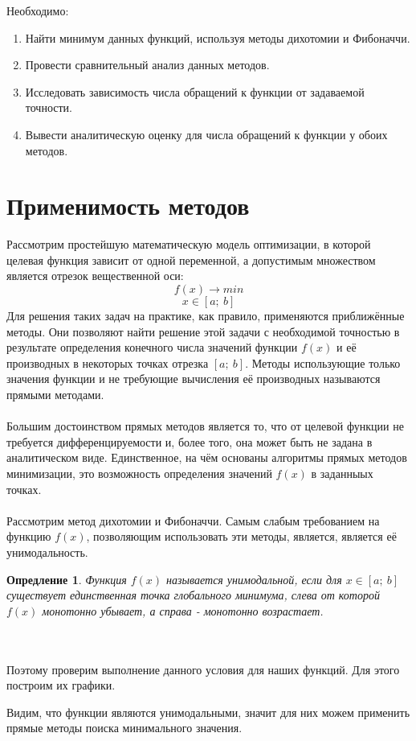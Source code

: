 \documentclass{article}
\newtheorem{definition}{Опредление}
\begin{document}
\noindent Необходимо:
\begin{enumerate}
    \item Найти минимум данных функций, используя методы дихотомии и Фибоначчи.
    \item Провести сравнительный анализ данных методов.
    \item Исследовать зависимость числа обращений к функции от задаваемой точности.
    \item Вывести аналитическую оценку  для числа обращений к функции у обоих методов.
\end{enumerate}

\section{Применимость методов}
\noindent Рассмотрим простейшую  математическую модель оптимизации, в которой целевая функция зависит от одной переменной, а допустимым множеством является отрезок вещественной оси:
$$f(x)\longrightarrow min$$
$$x \in [a;~b]$$
Для решения таких задач на практике, как правило, применяются приближённые методы. Они позволяют найти решение этой задачи с необходимой точностью в результате определения конечного числа значений функции $f(x)$ и её производных в некоторых точках отрезка $[a;~b]$. Методы использующие только значения функции и не требующие вычисления её производных называются прямыми методами.
\\\\
\noindent Большим достоинством прямых методов является то, что от целевой функции не требуется дифференцируемости и, более того, она может быть не задана в аналитическом виде. Единственное, на чём основаны алгоритмы прямых методов минимизации, это возможность определения значений $f(x)$ в заданныых точках.
\\\\
\noindent Рассмотрим метод дихотомии и Фибоначчи. Самым слабым требованием на функцию $f(x)$, позволяющим использовать эти методы, является, является её унимодальность.
\begin{definition}
Функция $f(x)$ называется унимодальной, если для $x\in [a;~b]$ существует единственная точка глобального минимума, слева от которой  $f(x)$ монотонно убывает, а справа - монотонно возрастает.
\end{definition}
\\\\
\noindent Поэтому проверим выполнение данного условия для наших функций. Для этого построим их графики.
\begin{figure}[H]
\label{fig:image}
\end{figure}
\begin{figure}[H]
\label{fig:image}
\end{figure}
\noindent Видим, что функции являются унимодальными, значит для них можем применить прямые методы поиска минимального значения.
\end{document}
